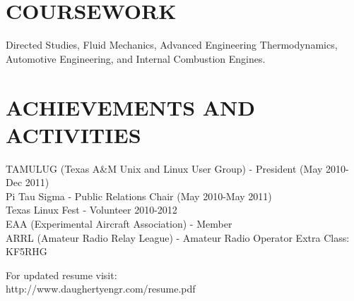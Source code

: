 \documentclass{res}
\begin{document}
\begin{resume}
\section{COURSEWORK}
	Directed Studies, Fluid Mechanics, Advanced Engineering Thermodynamics, Automotive Engineering, and Internal Combustion Engines.


\section{ACHIEVEMENTS AND ACTIVITIES}
	TAMULUG (Texas A\&M Unix and Linux User Group) - President (May 2010-Dec 2011)\\
	Pi Tau Sigma - Public Relations Chair (May 2010-May 2011)\\
	Texas Linux Fest - Volunteer 2010-2012\\
    EAA (Experimental Aircraft Association) - Member\\
    ARRL (Amateur Radio Relay League) - Amateur Radio Operator Extra Class: KF5RHG 

    \begin{center}
        For updated resume visit:\\
        http://www.daughertyengr.com/resume.pdf
    \end{center}
\end{resume}
\end{document}
